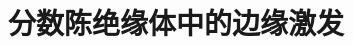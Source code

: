 \documentclass[cs4size, a4paper, twoside, openany]{sjtuthesis}
\begin{document}

\title{分数陈绝缘体中的边缘激发}
%

\maketitle


\makeenglishtitle

\frontmatter



\tableofcontents


%

\mainmatter







\appendix

\renewcommand\theequation{\Alph{chapter}--\arabic{equation}}
\renewcommand\thefigure{\Alph{chapter}--\arabic{figure}}
\renewcommand\thetable{\Alph{chapter}--\arabic{table}}


\end{document}
